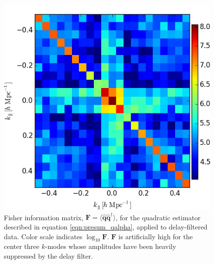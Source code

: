 \documentclass[twocolumn,numberedappendix]{emulateapj} \shorttitle{PSA64}
\newcommand{\qhat}{\hat{\mathbf{q}}}
\begin{document}
\begin{figure}\centering
\includegraphics[width=\columnwidth]{plots/fisher.png}
\caption{
Fisher information matrix, $\mathbf{F}=\langle\qhat\qhat^\dagger\rangle$, for the quadratic estimator described in
equation \ref{eqn:presum_qalpha}, applied to delay-filtered data. 
Color scale indicates $\log_{10}\mathbf{F}$.
$\mathbf{F}$ is artificially high for the center three $k$-modes whose amplitudes have been heavily
suppressed by the delay filter.
}


\label{fig:fisher}
\end{figure}
\end{document}
